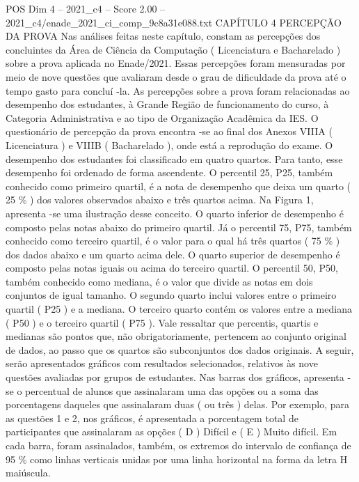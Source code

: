 \begin{textsample}{POS Dim 4 – 2021\_c4 – Score 2.00 – 2021\_c4/enade\_2021\_ci\_comp\_9c8a31e088.txt}  \label{ex:f4_pos_136}
CAPÍTULO 4 PERCEPÇÃO DA PROVA Nas análises feitas neste capítulo, constam as percepções dos concluintes da Área de Ciência da Computação ( Licenciatura e Bacharelado ) sobre a prova aplicada no Enade/2021.
Essas percepções foram mensuradas por meio de nove questões que avaliaram desde o grau de dificuldade da prova até o tempo gasto para concluí -la.
As percepções sobre a prova foram relacionadas ao desempenho dos estudantes, à Grande Região de funcionamento do curso, à Categoria Administrativa e ao tipo de Organização Acadêmica da IES.
O questionário de percepção da prova encontra -se ao final dos Anexos VIIIA ( Licenciatura ) e VIIIB ( Bacharelado ), onde está a reprodução do exame.
O desempenho dos estudantes foi classificado em quatro quartos.
Para tanto, esse desempenho foi ordenado de forma ascendente.
O percentil 25, P25, também conhecido como primeiro quartil, é a nota de desempenho que deixa um quarto ( 25 \% ) dos valores observados abaixo e três quartos acima.
Na Figura 1, apresenta -se uma ilustração desse conceito.
O quarto inferior de desempenho é composto pelas notas abaixo do primeiro quartil.
Já o percentil 75, P75, também conhecido como terceiro quartil, é o valor para o qual há três quartos ( 75 \% ) dos dados abaixo e um quarto acima dele.
O quarto superior de desempenho é composto pelas notas iguais ou acima do terceiro quartil.
O percentil 50, P50, também conhecido como mediana, é o valor que divide as notas em dois conjuntos de igual tamanho.
O segundo quarto inclui valores entre o primeiro quartil ( P25 ) e a mediana.
O terceiro quarto contém os valores entre a mediana ( P50 ) e o terceiro quartil ( P75 ).
Vale ressaltar que percentis, quartis e medianas são pontos que, não obrigatoriamente, pertencem ao conjunto original de dados, ao passo que os quartos são subconjuntos dos dados originais.
A seguir, serão apresentados gráficos com resultados selecionados, relativos às nove questões avaliadas por grupos de estudantes.
Nas barras dos gráficos, apresenta -se o percentual de alunos que assinalaram uma das opções ou a soma das porcentagens daqueles que assinalaram duas ( ou três ) delas.
Por exemplo, para as questões 1 e 2, nos gráficos, é apresentada a porcentagem total de participantes que assinalaram as opções ( D ) Difícil e ( E ) Muito difícil.
Em cada barra, foram assinalados, também, os extremos do intervalo de confiança de 95 \% como linhas verticais unidas por uma linha horizontal na forma da letra H maiúscula.

\end{textsample}
